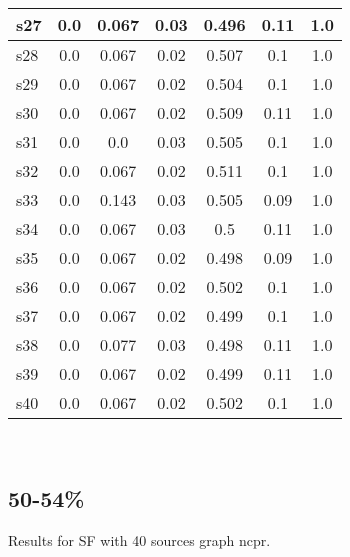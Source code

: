 \documentclass{article}
\begin{document}
\begin{tabular}{|l|c|c|c|c|c|c|}
\hline
s27 &0.0 & 0.067 & 0.03 & 0.496 & 0.11 & 1.0\\
\hline
s28 &0.0 & 0.067 & 0.02 & 0.507 & 0.1 & 1.0\\
\hline
s29 &0.0 & 0.067 & 0.02 & 0.504 & 0.1 & 1.0\\
\hline
s30 &0.0 & 0.067 & 0.02 & 0.509 & 0.11 & 1.0\\
\hline
s31 &0.0 & 0.0 & 0.03 & 0.505 & 0.1 & 1.0\\
\hline
s32 &0.0 & 0.067 & 0.02 & 0.511 & 0.1 & 1.0\\
\hline
s33 &0.0 & 0.143 & 0.03 & 0.505 & 0.09 & 1.0\\
\hline
s34 &0.0 & 0.067 & 0.03 & 0.5 & 0.11 & 1.0\\
\hline
s35 &0.0 & 0.067 & 0.02 & 0.498 & 0.09 & 1.0\\
\hline
s36 &0.0 & 0.067 & 0.02 & 0.502 & 0.1 & 1.0\\
\hline
s37 &0.0 & 0.067 & 0.02 & 0.499 & 0.1 & 1.0\\
\hline
s38 &0.0 & 0.077 & 0.03 & 0.498 & 0.11 & 1.0\\
\hline
s39 &0.0 & 0.067 & 0.02 & 0.499 & 0.11 & 1.0\\
\hline
s40 &0.0 & 0.067 & 0.02 & 0.502 & 0.1 & 1.0\\
\hline
\end{tabular}\\

\newpage

\subsection{50-54\%}

\noindent Results for SF with 40 sources graph ncpr.
\end{document}
